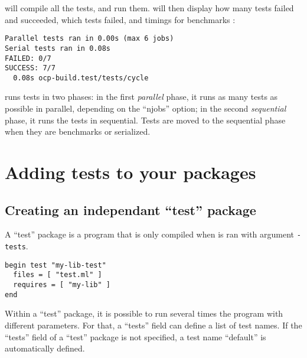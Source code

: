 \ocpbuild{} will compile all the tests, and run them. \ocpbuild{} will
then display how many tests failed and succeeded, which tests failed,
and timings for benchmarks :

\begin{verbatim}
Parallel tests ran in 0.00s (max 6 jobs)
Serial tests ran in 0.08s
FAILED: 0/7
SUCCESS: 7/7
  0.08s	ocp-build.test/tests/cycle
\end{verbatim}

\ocpbuild{} runs tests in two phases: in the first \emph{parallel}
phase, it runs as many tests as possible in parallel, depending on the
``njobs'' option; in the second \emph{sequential} phase, it runs the
tests in sequential. Tests are moved to the sequential phase when they
are benchmarks or serialized.

\section{Adding tests to your packages}

\subsection{Creating an independant ``test'' package}

A ``test'' package is a program that is only compiled when 
\ocpbuild{} is ran with argument \verb+-tests+.

\begin{verbatim}
begin test "my-lib-test"
  files = [ "test.ml" ]
  requires = [ "my-lib" ]
end
\end{verbatim}

Within a ``test'' package, it is possible to run several times the
program with different parameters. For that, a ``tests'' field can
define a list of test names. If the ``tests'' field of a ``test''
package is not specified, a test name ``default'' is automatically
defined.

